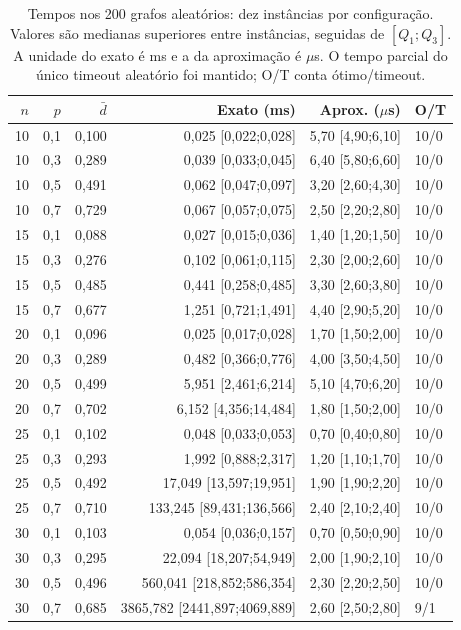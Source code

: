 \begin{table}[htbp]
\centering
\caption{Tempos nos 200 grafos aleatórios: dez instâncias por configuração. Valores são medianas superiores entre instâncias, seguidas de $[Q_1;Q_3]$. A unidade do exato é ms e a da aproximação é $\mu$s. O tempo parcial do único timeout aleatório foi mantido; O/T conta ótimo/timeout.}
\label{tab:configurations}
\small
\setlength{\tabcolsep}{3pt}
\begin{tabular}{rrrrrl}
\toprule
$n$ & $p$ & $\bar d$ & Exato (ms) & Aprox. ($\mu$s) & O/T \\
\midrule
10 & 0,1 & 0,100 & 0,025 [0,022;0,028] & 5,70 [4,90;6,10] & 10/0 \\
10 & 0,3 & 0,289 & 0,039 [0,033;0,045] & 6,40 [5,80;6,60] & 10/0 \\
10 & 0,5 & 0,491 & 0,062 [0,047;0,097] & 3,20 [2,60;4,30] & 10/0 \\
10 & 0,7 & 0,729 & 0,067 [0,057;0,075] & 2,50 [2,20;2,80] & 10/0 \\
15 & 0,1 & 0,088 & 0,027 [0,015;0,036] & 1,40 [1,20;1,50] & 10/0 \\
15 & 0,3 & 0,276 & 0,102 [0,061;0,115] & 2,30 [2,00;2,60] & 10/0 \\
15 & 0,5 & 0,485 & 0,441 [0,258;0,485] & 3,30 [2,60;3,80] & 10/0 \\
15 & 0,7 & 0,677 & 1,251 [0,721;1,491] & 4,40 [2,90;5,20] & 10/0 \\
20 & 0,1 & 0,096 & 0,025 [0,017;0,028] & 1,70 [1,50;2,00] & 10/0 \\
20 & 0,3 & 0,289 & 0,482 [0,366;0,776] & 4,00 [3,50;4,50] & 10/0 \\
20 & 0,5 & 0,499 & 5,951 [2,461;6,214] & 5,10 [4,70;6,20] & 10/0 \\
20 & 0,7 & 0,702 & 6,152 [4,356;14,484] & 1,80 [1,50;2,00] & 10/0 \\
25 & 0,1 & 0,102 & 0,048 [0,033;0,053] & 0,70 [0,40;0,80] & 10/0 \\
25 & 0,3 & 0,293 & 1,992 [0,888;2,317] & 1,20 [1,10;1,70] & 10/0 \\
25 & 0,5 & 0,492 & 17,049 [13,597;19,951] & 1,90 [1,90;2,20] & 10/0 \\
25 & 0,7 & 0,710 & 133,245 [89,431;136,566] & 2,40 [2,10;2,40] & 10/0 \\
30 & 0,1 & 0,103 & 0,054 [0,036;0,157] & 0,70 [0,50;0,90] & 10/0 \\
30 & 0,3 & 0,295 & 22,094 [18,207;54,949] & 2,00 [1,90;2,10] & 10/0 \\
30 & 0,5 & 0,496 & 560,041 [218,852;586,354] & 2,30 [2,20;2,50] & 10/0 \\
30 & 0,7 & 0,685 & 3865,782 [2441,897;4069,889] & 2,60 [2,50;2,80] & 9/1 \\
\bottomrule
\end{tabular}
\end{table}
